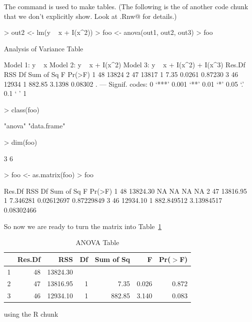 \documentclass{article}
\begin{document}
The \verb@xtable@ command is used to make tables.  (The following
is the \verb@Sweave@ of another code chunk that we don't explicitly
show.  Look at \verb@foo.Rnw@ for details.)
\begin{Schunk}
\begin{Sinput}
> out2 <- lm(y ~ x + I(x^2))
> foo <- anova(out1, out2, out3)
> foo
\end{Sinput}
\begin{Soutput}
Analysis of Variance Table

Model 1: y ~ x
Model 2: y ~ x + I(x^2)
Model 3: y ~ x + I(x^2) + I(x^3)
  Res.Df   RSS Df Sum of Sq      F  Pr(>F)  
1     48 13824                              
2     47 13817  1      7.35 0.0261 0.87230  
3     46 12934  1    882.85 3.1398 0.08302 .
---
Signif. codes:  0 ‘***’ 0.001 ‘**’ 0.01 ‘*’ 0.05 ‘.’ 0.1 ‘ ’ 1
\end{Soutput}
\begin{Sinput}
> class(foo)
\end{Sinput}
\begin{Soutput}
[1] "anova"      "data.frame"
\end{Soutput}
\begin{Sinput}
> dim(foo)
\end{Sinput}
\begin{Soutput}
[1] 3 6
\end{Soutput}
\begin{Sinput}
> foo <- as.matrix(foo)
> foo
\end{Sinput}
\begin{Soutput}
  Res.Df      RSS Df  Sum of Sq          F     Pr(>F)
1     48 13824.30 NA         NA         NA         NA
2     47 13816.95  1   7.346281 0.02612697 0.87229849
3     46 12934.10  1 882.849512 3.13984517 0.08302466
\end{Soutput}
\end{Schunk}
So now we are ready to turn the matrix \verb@foo@
into Table~\ref{tab:one}
\begin{table}[tbp]
\centering
\caption{ANOVA Table} 
\label{tab:one}
\begin{tabular}{rrrrrrr}
  \hline
 & Res.Df & RSS & Df & Sum of Sq & F & Pr($>$F) \\ 
  \hline
1 & 48 & 13824.30 &  &  &  &  \\ 
  2 & 47 & 13816.95 & 1 & 7.35 & 0.026 & 0.872 \\ 
  3 & 46 & 12934.10 & 1 & 882.85 & 3.140 & 0.083 \\ 
   \hline
\end{tabular}
\end{table}using the R chunk
\end{document}
